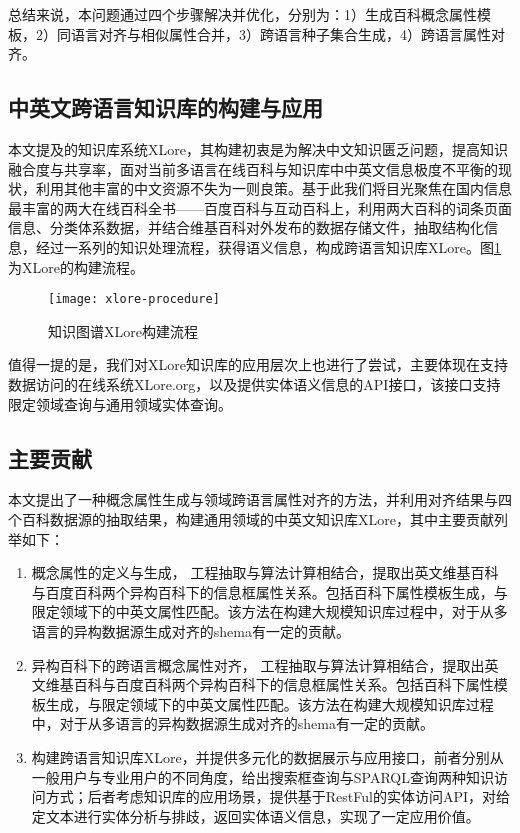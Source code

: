 总结来说，本问题通过四个步骤解决并优化，分别为：1）生成百科概念属性模板，2）同语言对齐与相似属性合并，3）跨语言种子集合生成，4）跨语言属性对齐。


\subsection{中英文跨语言知识库的构建与应用}
本文提及的知识库系统XLore，其构建初衷是为解决中文知识匮乏问题，提高知识融合度与共享率，面对当前多语言在线百科与知识库中中英文信息极度不平衡的现状，利用其他丰富的中文资源不失为一则良策。基于此我们将目光聚焦在国内信息最丰富的两大在线百科全书——百度百科与互动百科上，利用两大百科的词条页面信息、分类体系数据，并结合维基百科对外发布的数据存储文件，抽取结构化信息，经过一系列的知识处理流程，获得语义信息，构成跨语言知识库XLore。图\ref{fig:xlore-procedure}为XLore的构建流程。

\begin{figure}[H]
  \centering
  \texttt{[image: xlore-procedure]}
  \caption{知识图谱XLore构建流程}
  \label{fig:xlore-procedure}
\end{figure}

值得一提的是，我们对XLore知识库的应用层次上也进行了尝试，主要体现在支持数据访问的在线系统XLore.org，以及提供实体语义信息的API接口，该接口支持限定领域查询与通用领域实体查询。

\subsection{主要贡献}
本文提出了一种概念属性生成与领域跨语言属性对齐的方法，并利用对齐结果与四个百科数据源的抽取结果，构建通用领域的中英文知识库XLore，其中主要贡献列举如下：
\begin{enumerate}[1)]
\item {\heiti 概念属性的定义与生成，} 工程抽取与算法计算相结合，提取出英文维基百科与百度百科两个异构百科下的信息框属性关系。包括百科下属性模板生成，与限定领域下的中英文属性匹配。该方法在构建大规模知识库过程中，对于从多语言的异构数据源生成对齐的shema有一定的贡献。
\item {\heiti 异构百科下的跨语言概念属性对齐，} 工程抽取与算法计算相结合，提取出英文维基百科与百度百科两个异构百科下的信息框属性关系。包括百科下属性模板生成，与限定领域下的中英文属性匹配。该方法在构建大规模知识库过程中，对于从多语言的异构数据源生成对齐的shema有一定的贡献。
\item {\heiti 构建跨语言知识库XLore，并提供多元化的数据展示与应用接口，}前者分别从一般用户与专业用户的不同角度，给出搜索框查询与SPARQL查询两种知识访问方式；后者考虑知识库的应用场景，提供基于RestFul的实体访问API，对给定文本进行实体分析与排歧，返回实体语义信息，实现了一定应用价值。
\end{enumerate}

